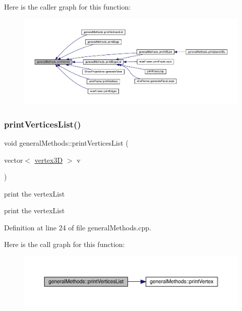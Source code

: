 Here is the caller graph for this function\+:
\nopagebreak
\begin{figure}[H]
\begin{center}
\leavevmode
\includegraphics[width=350pt]{namespacegeneral_methods_a694306c7472ee1bbfb3c90c0f3d5453a_icgraph}
\end{center}
\end{figure}
\mbox{\label{namespacegeneral_methods_a9cbf7d7c2019f0e2b6f9773b687b50cd}} 
\subsubsection{\texorpdfstring{print\+Vertices\+List()}{printVerticesList()}}
{\footnotesize\ttfamily void general\+Methods\+::print\+Vertices\+List (\begin{DoxyParamCaption}\item[{vector$<$ \mbox{\hyperlink{structvertex3_d}{vertex3D}} $>$}]{v }\end{DoxyParamCaption})}

print the vertex\+List

print the vertex\+List

Definition at line 24 of file general\+Methods.\+cpp.

Here is the call graph for this function\+:
\nopagebreak
\begin{figure}[H]
\begin{center}
\leavevmode
\includegraphics[width=350pt]{namespacegeneral_methods_a9cbf7d7c2019f0e2b6f9773b687b50cd_cgraph}
\end{center}
\end{figure}
\mbox{\label{namespacegeneral_methods_a13072e8b14fcea9ae253085569062158}} 

